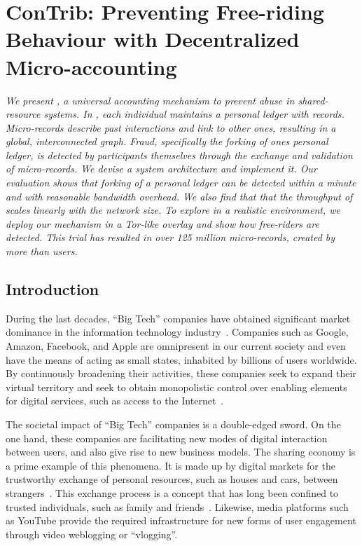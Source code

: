 \chapter{ConTrib: Preventing Free-riding Behaviour with Decentralized Micro-accounting}
\label{chapter:trustchain}

\emph{We present \ModelName{}, a universal accounting mechanism to prevent abuse in shared-resource systems.
In \ModelName{}, each individual maintains a personal ledger with \emph{records}.
Micro-records describe past interactions and link to other ones, resulting in a global, interconnected graph.
Fraud, specifically the forking of ones personal ledger, is detected by participants themselves through the exchange and validation of micro-records.
We devise a system architecture and implement it.
Our evaluation shows that forking of a personal ledger can be detected within a minute and with reasonable bandwidth overhead.
We also find that that the throughput of \ModelName{} scales linearly with the network size.
To explore \ModelName{} in a realistic environment, we deploy our mechanism in a Tor-like overlay and show how free-riders are detected.
This trial has resulted in over 125 million micro-records, created by more than \TrialUsers{} users.}

\newpage

\section{Introduction}

During the last decades, \enquote{Big Tech} companies have obtained significant market dominance in the information technology industry~\cite{frost2019bigtech}.
Companies such as Google, Amazon, Facebook, and Apple are omnipresent in our current society and even have the means of acting as small states, inhabited by billions of users worldwide.
By continuously broadening their activities, these companies seek to expand their virtual territory and seek to obtain monopolistic control over enabling elements for digital services, such as access to the Internet~\cite{best2014internet}.

The societal impact of \enquote{Big Tech} companies is a double-edged sword.
On the one hand, these companies are facilitating new modes of digital interaction between users, and also give rise to new business models.
The sharing economy is a prime example of this phenomena.
It is made up by digital markets for the trustworthy exchange of personal resources, such as houses and cars, between strangers~\cite{schor2016debating}.
This exchange process is a concept that has long been confined to trusted individuals, such as family and friends~\cite{frenken2019putting}.
Likewise, media platforms such as YouTube provide the required infrastructure for new forms of user engagement through video weblogging or \enquote{vlogging}.

